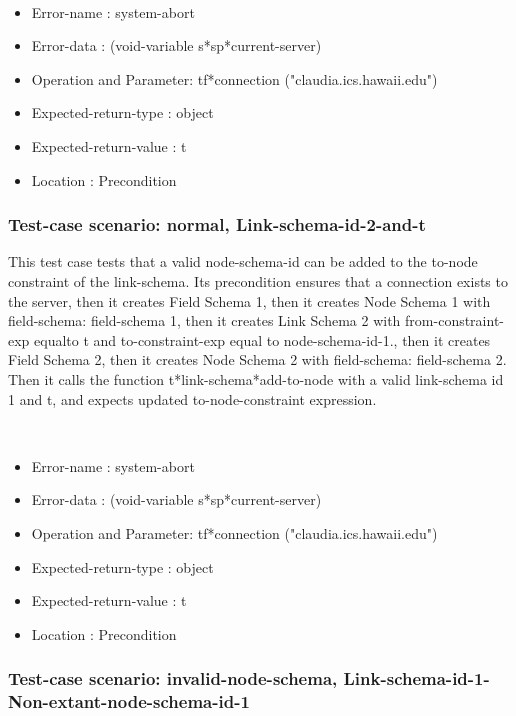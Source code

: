 \
\begin {itemize}
\item 	Error-name             : system-abort
\item Error-data             : (void-variable s*sp*current-server)
\item Operation and Parameter: tf*connection ("claudia.ics.hawaii.edu")
\item Expected-return-type   : object
\item Expected-return-value  : t
\item Location               : Precondition



\end {itemize}
\subsubsection {Test-case scenario: normal, Link-schema-id-2-and-t}


This test case tests that a valid node-schema-id can be added to the to-node constraint of the link-schema.
Its precondition ensures that a connection exists to the server, then it creates Field Schema 1, then it creates Node Schema 1 with field-schema: field-schema 1, then it creates Link Schema 2 with from-constraint-exp equalto t and to-constraint-exp equal to node-schema-id-1., then it creates Field Schema 2, then it creates Node Schema 2 with field-schema: field-schema 2.
Then it calls the function t*link-schema*add-to-node  with a valid link-schema id 1 and t, and expects updated to-node-constraint expression.



\
\begin {itemize}
\item 	Error-name             : system-abort
\item Error-data             : (void-variable s*sp*current-server)
\item Operation and Parameter: tf*connection ("claudia.ics.hawaii.edu")
\item Expected-return-type   : object
\item Expected-return-value  : t
\item Location               : Precondition



\end {itemize}
\subsubsection {Test-case scenario: invalid-node-schema, Link-schema-id-1-Non-extant-node-schema-id-1}


